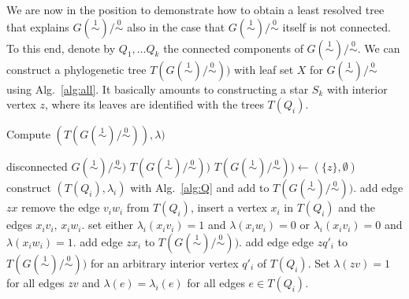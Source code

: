 \documentclass[smallextended]{svjour3}
\newcommand{\rev}[1]{\begingroup\color{blue}#1\endgroup}
\newcommand{\Ro}{\mathrel{\overset{0}{\sim}}}
\newcommand{\Rl}{\mathrel{\overset{1}{\sim}}}
\begin{document}


We are now in the position to demonstrate how to obtain a least resolved
tree that explains $G(\Rl)/\Ro$ also in the case that $G(\Rl)/\Ro$ itself
is not connected. To this end, denote by $Q_1,\dots Q_k$ the connected
components of $G(\Rl)/\Ro$. We can construct a \rev{phylogenetic tree
  $T(G(\Rl)/\Ro))$ with leaf set $X$} for $G(\Rl)/\Ro$ using Alg.\
\ref{alg:all}. It basically amounts to constructing a star $S_k$ with
interior vertex $z$, where its leaves are identified with the trees
$T(Q_i)$.

\begin{algorithm}
\caption{Compute $(T(G(\Rl)/\Ro)), \lambda)$}
\label{alg:all}
\begin{algorithmic}[1]
  \REQUIRE disconnected $G(\Rl)/\Ro)$
  \ENSURE $T(G(\Rl)/\Ro))$	
  \STATE $T(G(\Rl)/\Ro)) \gets (\{z\},\emptyset)$
     \STATE	construct $(T(Q_i), \lambda_i)$ with Alg.\ \ref{alg:Q}
		and add to $T(G(\Rl)/\Ro))$.
	\STATE add edge $zx$
        \STATE remove the edge
                $v_iw_i$ from $T(Q_i)$, insert a vertex $x_i$ in $T(Q_i)$
                and the edges $x_iv_i$, $x_iw_i$. 
        \STATE  set either $\lambda_{i}(x_iv_i)=1$ and $\lambda(x_iw_i)=0$
		or $\lambda_{i}(x_iv_i)=0$ and $\lambda(x_iw_i)=1$. 
                \label{step:edge}
	\STATE  add edge $zx_i$ to $T(G(\Rl)/\Ro))$.
     \ELSE \STATE \label{item:z}  	
                add edge edge $zq'_i$ to  $T(G(\Rl)/\Ro))$
		for an arbitrary interior vertex $q'_i$ of $T(Q_i)$. 
     \ENDIF		 
   \ENDFOR
   \STATE       Set $\lambda(zv)=1$ for all edges $zv$ and 
		$\lambda(e)=\lambda_i(e)$ for all edges $e\in T(Q_i)$.	
\end{algorithmic}
\end{algorithm}
\end{document}
